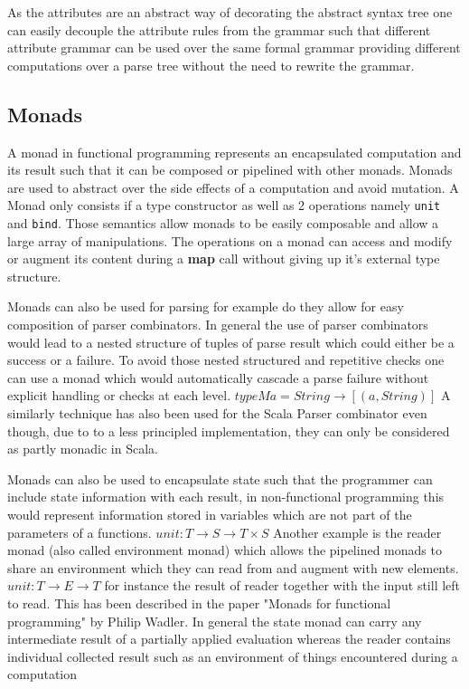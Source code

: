 As the attributes are an abstract way of decorating the abstract syntax tree one can easily decouple the attribute rules from the grammar such that different attribute grammar can be used over the same formal grammar providing different computations over a parse tree without the need to rewrite the grammar.

\subsection{Monads}
A monad in functional programming represents an encapsulated computation and its result such that it can be composed or pipelined with other monads. Monads are used to abstract over the side effects of a computation and avoid mutation. A Monad only consists if a type constructor as well as 2 operations namely \verb/unit/ and \verb/bind/. Those semantics allow monads to be easily composable and allow a large array of manipulations. The operations on a monad can access and modify or augment its content during a \textbf{map} call without giving up it's external type structure.
 
Monads can also be used for parsing for example do they allow for easy composition of parser combinators. In general the use of parser combinators would lead to a nested structure of tuples of parse result which could either be a success or a failure. To avoid those nested structured and repetitive checks one can use a monad which would automatically cascade a parse failure without explicit handling or checks at each level.
$type M a = String \rightarrow [(a, String)]$
A similarly technique has also been used for the Scala Parser combinator even though, due to to a less principled implementation, they can only be considered as partly monadic in Scala.

Monads can also be used to encapsulate state such that the programmer can include state information with each result, in non-functional programming this would represent information stored in variables which are not part of the parameters of a functions.
$unit: T \rightarrow S \rightarrow T \times S $
Another example is the reader monad (also called environment monad) which allows the pipelined monads to share an environment which they can read from and augment with new elements.
$unit: T \rightarrow E \rightarrow T $
for instance the result of reader together with the input still left to read. This has been described in the paper "Monads for functional programming" by Philip Wadler. In general the state monad can carry any intermediate result of a partially applied evaluation whereas the reader contains individual collected result such as an environment of things encountered during a computation

